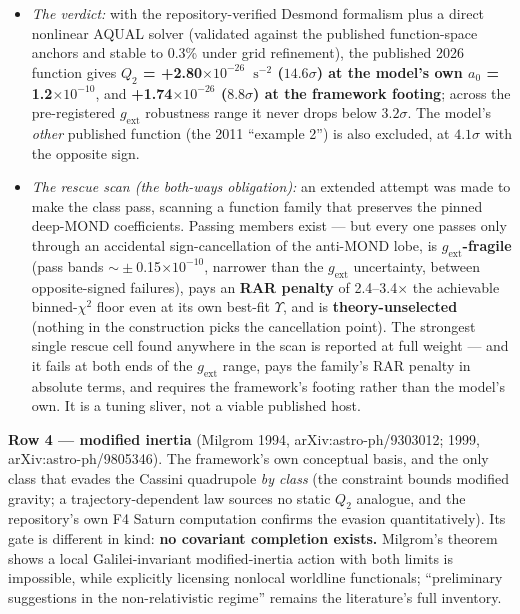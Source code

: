 \documentclass[11pt,a4paper]{article}
\begin{document}
\begin{itemize}
\item \emph{The verdict:} with the repository-verified Desmond formalism plus a direct nonlinear AQUAL solver (validated against the published function-space anchors and stable to 0.3\% under grid refinement), the published 2026 function gives \textbf{$Q_2$ = +2.80$\times10^{-26}$\ $\mathrm{s^{-2}}$ ($14.6\sigma$) at the model's own $a_{0}$ = 1.2$\times10^{-10}$}, and \textbf{+1.74$\times10^{-26}$ ($8.8\sigma$) at the framework footing}; across the pre-registered $g_{\mathrm{ext}}$ robustness range it never drops below $3.2\sigma$. The model's \emph{other} published function (the 2011 ``example 2'') is also excluded, at $4.1\sigma$ with the opposite sign.

\item \emph{The rescue scan (the both-ways obligation):} an extended attempt was made to make the class pass, scanning a function family that preserves the pinned deep-MOND coefficients. Passing members exist --- but every one passes only through an accidental sign-cancellation of the anti-MOND lobe, is \textbf{$g_{\mathrm{ext}}$-fragile} (pass bands $\sim{}\pm$0.15$\times10^{-10}$, narrower than the $g_{\mathrm{ext}}$ uncertainty, between opposite-signed failures), pays an \textbf{RAR penalty} of 2.4--3.4$\times$ the achievable binned-$\chi^{2}$ floor even at its own best-fit $\Upsilon$, and is \textbf{theory-unselected} (nothing in the construction picks the cancellation point). The strongest single rescue cell found anywhere in the scan is reported at full weight --- and it fails at both ends of the $g_{\mathrm{ext}}$ range, pays the family's RAR penalty in absolute terms, and requires the framework's footing rather than the model's own. It is a tuning sliver, not a viable published host.

\end{itemize}

\textbf{Row 4 --- modified inertia} (Milgrom 1994, arXiv:astro-ph/9303012; 1999, arXiv:astro-ph/9805346). The framework's own conceptual basis, and the only class that evades the Cassini quadrupole \emph{by class} (the constraint bounds modified gravity; a trajectory-dependent law sources no static $Q_2$ analogue, and the repository's own F4 Saturn computation confirms the evasion quantitatively). Its gate is different in kind: \textbf{no covariant completion exists.} Milgrom's theorem shows a local Galilei-invariant modified-inertia action with both limits is impossible, while explicitly licensing nonlocal worldline functionals; ``preliminary suggestions in the non-relativistic regime'' remains the literature's full inventory.
\end{document}
